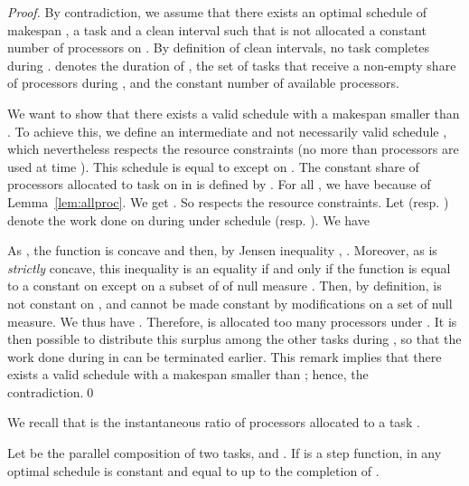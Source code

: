 \documentclass{llncs}
\begin{document}
\begin{proof}
  By contradiction, we assume that there exists an optimal schedule
   of makespan , a task  and a clean interval
   such that  is not allocated a constant number of
  processors on . By definition of clean intervals, no task
  completes during .  denotes the duration of ,
   the set of tasks that receive a non-empty share of processors
  during , and  the constant number of available processors.
	




  We want to show that there exists a valid schedule with a makespan
  smaller than . To achieve this, we define an intermediate and
  not necessarily valid schedule , which
  nevertheless respects the resource constraints (no more than
   processors are used at time ). This schedule is
  equal to  except on .
The constant share of processors allocated to task  on  in
   is defined by .  For all , we have  because
  of Lemma~\ref{lem:allproc}. We get . So
   respects the resource constraints.
  Let  (resp. ) denote the
  work done on  during  under schedule 
  (resp. ).
    We have 
  
  As , the function  is concave and then,
  by Jensen inequality \cite{Hardy}, .  Moreover, as  is
  \emph{strictly} concave, this inequality is an equality if and only
  if the function  is equal to a constant on
   except on a subset of  of null measure \cite{Hardy}.
  Then, by definition,  is not constant on , and
  cannot be made constant by modifications on a set of null measure.
  We thus have .
Therefore,  is allocated too many processors under
  .  It is then possible to distribute this surplus among
  the other tasks during , so that the work done during  in
   can be terminated earlier. This remark implies that
  there exists a valid schedule with a makespan smaller than ;
  hence, the contradiction.\qed
\end{proof}


We recall that   is the instantaneous ratio of
processors allocated to a task  .

\begin{lemma}
\label{lem:rate}
Let  be the parallel composition of two tasks,  and . If
 is a step function, in any optimal schedule  is
constant and equal to  up to the completion of .
\end{lemma}
\end{document}

